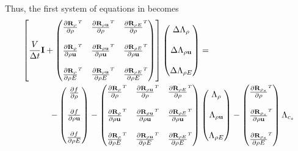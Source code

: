 Thus, the first system of equations in  becomes
\begin{equation}
  \begin{split}
    \left[
      \frac{V}{\Delta t} \mi +
      \begin{pmatrix}
        \rtdiff{\rho}{\rho} & \rtdiff{\rho \vu}{\rho} & \rtdiff{\rho E}{\rho} \\ \\
        \rtdiff{\rho}{\rho \vu} & \rtdiff{\rho \vu}{\rho \vu} & \rtdiff{\rho E}{\rho \vu} \\ \\
        \rtdiff{\rho}{\rho E} & \rtdiff{\rho \vu}{\rho E} & \rtdiff{\rho E}{\rho E}
      \end{pmatrix}
    \right]
    \begin{pmatrix}
      \Delta \adjlam{\rho} \\ \\
      \Delta \adjlam{\rho \vu} \\ \\
      \Delta \adjlam{\rho E}
    \end{pmatrix}
    &= \\ -
    \begin{pmatrix}
      \pd{f}{\rho} \\ \\
      \pd{f}{\rho \vu} \\ \\
      \pd{f}{\rho E}
    \end{pmatrix}
    -
    \begin{pmatrix}
      \rtdiff{\rho}{\rho} & \rtdiff{\rho \vu}{\rho} & \rtdiff{\rho E}{\rho} \\ \\
      \rtdiff{\rho}{\rho \vu} & \rtdiff{\rho \vu}{\rho \vu} & \rtdiff{\rho E}{\rho \vu} \\ \\
      \rtdiff{\rho}{\rho E} & \rtdiff{\rho \vu}{\rho E} & \rtdiff{\rho E}{\rho E}
    \end{pmatrix}
    &
    \begin{pmatrix}
      \adjlam{\rho} \\ \\
      \adjlam{\rho \vu} \\ \\
      \adjlam{\rho E}
    \end{pmatrix}
    -
    \begin{pmatrix}
      \rtdiff{\rho_s}{\rho} \\ \\
      \rtdiff{\rho_s}{\rho \vu} \\ \\
      \rtdiff{\rho_s}{\rho E}
    \end{pmatrix}
    \adjlam{c_s}
  \end{split}
  \label{adj-dc-time1}
\end{equation}
